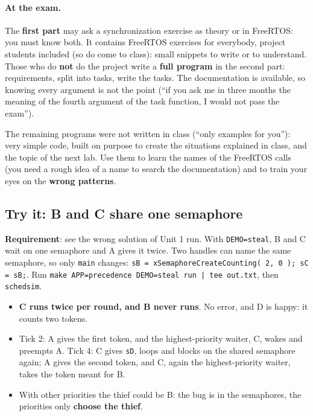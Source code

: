 \paragraph{At the exam.} The \textbf{first part} may ask a synchronization exercise as theory or in FreeRTOS: you must know both. It contains FreeRTOS exercises for everybody, project students included (so do come to class): small snippets to write or to understand. Those who do \textbf{not} do the project write a \textbf{full program} in the second part: requirements, split into tasks, write the tasks. The documentation is available, so knowing every argument is not the point (``if you ask me in three months the meaning of the fourth argument of the task function, I would not pass the exam'').

The remaining programs were not written in class (``only examples for you''): very simple code, built on purpose to create the situations explained in class, and the topic of the next lab. Use them to learn the names of the FreeRTOS calls (you need a rough idea of a name to search the documentation) and to train your eyes on the \textbf{wrong patterns}.

\subsection{Try it: B and C share one semaphore}
\textbf{Requirement}: see the wrong solution of Unit 1 run. With \texttt{DEMO=steal}, B and C wait on one semaphore and A gives it twice. Two handles can name the same semaphore, so only \texttt{main} changes: \texttt{sB = xSemaphoreCreateCounting( 2, 0 ); sC = sB;}. Run \texttt{make APP=precedence DEMO=steal run | tee out.txt}, then \texttt{schedsim}.
\begin{itemize}
    \item \textbf{C runs twice per round, and B never runs}. No error, and D is happy: it counts two tokens.
    \item Tick 2: A gives the first token, and the highest-priority waiter, C, wakes and preempts A. Tick 4: C gives \texttt{sD}, loops and blocks on the shared semaphore again; A gives the second token, and C, again the highest-priority waiter, takes the token meant for B.
    \item With other priorities the thief could be B: the bug is in the semaphores, the priorities only \textbf{choose the thief}.
\end{itemize}

